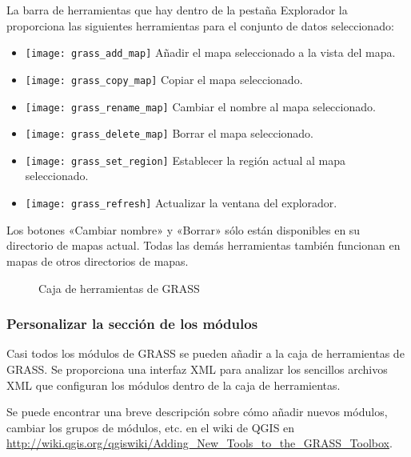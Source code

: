 La barra de herramientas que hay dentro de la pestaña Explorador la proporciona las siguientes herramientas para el conjunto de datos seleccionado:
\begin{itemize}
\item \texttt{[image: grass\_add\_map]} Añadir el mapa seleccionado a la vista del mapa.
\item \texttt{[image: grass\_copy\_map]} Copiar el mapa seleccionado.
\item \texttt{[image: grass\_rename\_map]} Cambiar el nombre al mapa seleccionado.
\item \texttt{[image: grass\_delete\_map]} Borrar el mapa seleccionado.
\item \texttt{[image: grass\_set\_region]} Establecer la región actual al mapa seleccionado.
\item \texttt{[image: grass\_refresh]} Actualizar la ventana del explorador.
\end{itemize}

Los botones «Cambiar nombre» y «Borrar» sólo están disponibles en su directorio de mapas actual. Todas las demás herramientas también funcionan en mapas de otros directorios de mapas.

\begin{figure}[h]
\centering
	\caption{Caja de herramientas de GRASS}
   \goodgap
\end{figure}

\subsubsection{Personalizar la sección de los módulos} 
\label{sec:toolbox-customizing}

Casi todos los módulos de GRASS se pueden añadir a la caja de herramientas de GRASS. Se proporciona una interfaz XML para analizar los sencillos archivos XML que configuran los módulos dentro de la caja de herramientas.

Se puede encontrar una breve descripción sobre cómo añadir nuevos módulos, cambiar los grupos de módulos, etc. en el wiki de QGIS en \url{http://wiki.qgis.org/qgiswiki/Adding\_New\_Tools\_to\_the\_GRASS\_Toolbox}.


